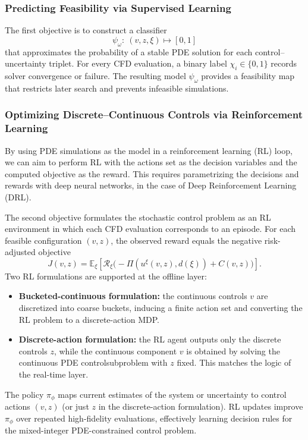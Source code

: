 \documentclass{article}
\newcommand{\1}{\mathds{1}}          %
\theoremstyle{definition}
\begin{document}
\begin{sloppypar}
\subsubsection{Predicting Feasibility via Supervised Learning}
The first objective is to construct a classifier
\[
\psi_{\omega}:\ (v,z,\xi)\mapsto [0,1]
\]
that approximates the probability of a stable PDE solution for each control--uncertainty triplet. For every CFD evaluation, a binary label $\chi_i\in\{0,1\}$ records solver convergence or failure. The resulting model $\psi_{\omega}$ provides a feasibility map that restricts later search and prevents infeasible simulations.
\subsubsection{Optimizing Discrete--Continuous Controls via Reinforcement Learning}


By using PDE simulations as the model in a reinforcement learning (RL) loop, we can aim to perform RL with the actions set as the decision variables and the computed objective as the reward. This requires parametrizing the decisions and rewards with deep neural networks, in the case of Deep Reinforcement Learning (DRL). 


The second objective formulates the stochastic control problem as an RL environment in which each CFD evaluation corresponds to an episode.
For each feasible configuration $(v,z)$, the observed reward equals the negative risk-adjusted objective
\[
J(v,z)
=\mathbb{E}_{\xi}\!\left[
\mathcal{R}_{\xi}\!\big(-\Pi(u^{\xi}(v,z),d(\xi)) + C(v,z)\big)
\right].
\]
Two RL formulations are supported at the offline layer:
\begin{itemize}
    \item [(a)] \textbf{Bucketed-continuous formulation:} the continuous controls $v$ are discretized into coarse buckets, inducing a finite action set and converting the RL problem to a discrete-action MDP.
    \item [(b) ] \textbf{Discrete-action formulation:} the RL agent outputs only the discrete controls $z$, while the continuous component $v$ is obtained by solving the continuous PDE controlsubproblem with $z$ fixed. This matches the logic of the real-time layer.
\end{itemize}
The policy $\pi_{\phi}$ maps current estimates of the system or uncertainty to control actions $(v,z)$ (or just $z$ in the discrete-action formulation). RL updates improve $\pi_{\phi}$ over repeated high-fidelity evaluations, effectively learning decision rules for the mixed-integer PDE-constrained control problem.

\end{sloppypar}
\end{document}
